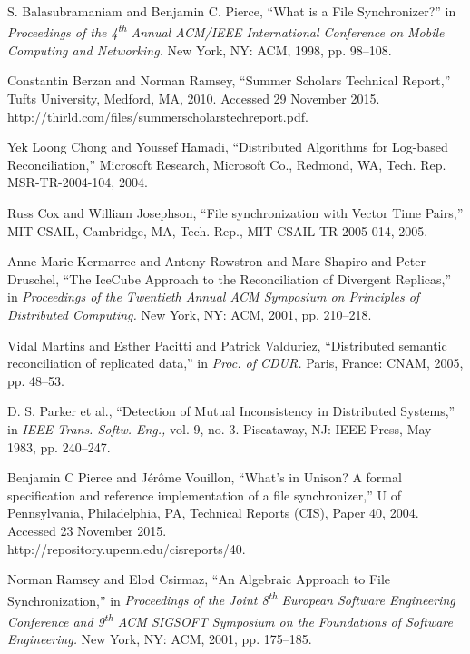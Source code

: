 
S. Balasubramaniam and Benjamin C. Pierce,
``What is a File Synchronizer?''
in \emph{Proceedings of the 4\textsuperscript{th} Annual 
ACM/IEEE International Conference on Mobile Computing and Networking.}
New York, NY: ACM, 1998, pp. 98--108.

Constantin Berzan and Norman Ramsey,
``Summer Scholars Technical Report,''
Tufts University, Medford, MA, 2010.
Accessed 29 November 2015.
http://thirld.com/files/summerscholars\undersc techreport.pdf.

Yek Loong Chong and Youssef Hamadi,
``Distributed Algorithms for Log-based Reconciliation,''
Microsoft Research, Microsoft Co., Redmond, WA,
Tech. Rep. MSR-TR-2004-104, 2004.

Russ Cox and William Josephson,
``File synchronization with Vector Time Pairs,''
MIT CSAIL, Cambridge, MA, 
Tech. Rep., MIT-CSAIL-TR-2005-014, 2005.

Anne-Marie Kermarrec and Antony Rowstron and Marc Shapiro and Peter Druschel,
``The IceCube Approach to the Reconciliation of Divergent Replicas,''
in \emph{Proceedings of the Twentieth Annual ACM Symposium on Principles of Distributed Computing.}
New York, NY: ACM, 2001, pp. 210--218.

Vidal Martins and Esther Pacitti and Patrick Valduriez,
``Distributed semantic reconciliation of replicated data,''
in \emph{Proc. of CDUR.}
Paris, France: CNAM,
2005,
pp. 48--53.

D. S. Parker et al.,
``Detection of Mutual Inconsistency in Distributed Systems,''
in \emph{IEEE Trans. Softw. Eng.,}
vol. 9, no. 3.
Piscataway, NJ: IEEE Press,
May 1983,
pp. 240--247.

Benjamin C Pierce and J{\'e}r{\^o}me Vouillon,
``What's in Unison? A formal specification and reference implementation of a file synchronizer,''
U of Pennsylvania,
Philadelphia, PA,
Technical Reports (CIS),
Paper 40,
2004.
Accessed 23 November 2015.\\
http://repository.upenn.edu/cis\undersc reports/40.

Norman Ramsey and Elod Csirmaz,
``An Algebraic Approach to File Synchronization,''
in \emph{Proceedings of the Joint 8\textsuperscript{th} European Software Engineering Conference 
and 9\textsuperscript{th} ACM SIGSOFT Symposium on the Foundations of Software Engineering.}
New York, NY: ACM, 2001, pp. 175--185.

